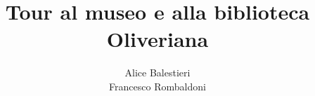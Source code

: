 \documentclass[hidelinks,12pt,a4paper]{article}
\begin{document}
	\begin{flushleft}
		
		\LARGE
		
		\title{\textbf{Tour al museo e alla biblioteca Oliveriana}}
		\author{Alice Balestieri\\Francesco Rombaldoni}
		\date{}
		
		\maketitle
		\setcounter{page}{1}
		\newpage
		
		\tableofcontents
		\newpage
		
		
		\vspace*{\fill}
		\doclicenseThis
		
	\end{flushleft}
\end{document}
